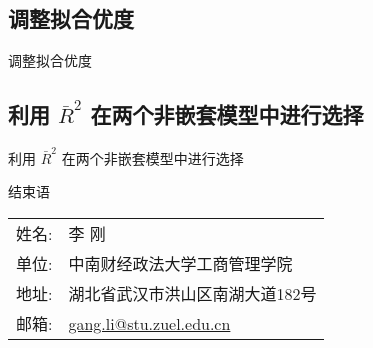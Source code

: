 \documentclass[UTF8]{ctexbeamer}
\begin{document}
\subsection{调整拟合优度}
\begin{frame}{调整拟合优度}
\end{frame}

\subsection{利用 $\bar R^2$ 在两个非嵌套模型中进行选择}
\begin{frame}{利用 $\bar R^2$ 在两个非嵌套模型中进行选择}
\end{frame}


\begin{frame}{结束语}
\linespread{1.25}
\begin{center}
\vspace{5mm}\large
\begin{tabular}{ll}
{\sc 姓名}:  & \textsf{李 刚}\\
{\sc 单位}: & 中南财经政法大学工商管理学院 \\
{\sc 地址}: & 湖北省武汉市洪山区南湖大道182号 \\
{\sc 邮箱}: & \href{mailto:gang.li@stu.zuel.edu.cn}{\color{blue}gang.li@stu.zuel.edu.cn}\\
\end{tabular}
\end{center}
\end{frame}
\end{document}
